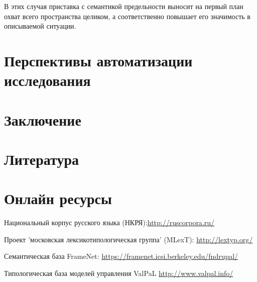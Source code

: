 В этих случая приставка с семантикой предельности выносит на первый план охват всего пространства целиком, а соответственно повышает его значимость в описываемой ситуации. 


\section{Перспективы автоматизации исследования}


\section{Заключение} \label{final}


\pagebreak
\section{Литература}
\renewcommand{\bibsection}{}
 

\section{Онлайн ресурсы}







\noindent \hypertarget{rusc}{Национальный корпус русского языка (НКРЯ)}:\;\url{http://ruscorpora.ru/} \medskip



\noindent \hypertarget{mlext}{Проект 'московская лексикотипологическая группа' (MLexT)}:\; \url{http://lextyp.org/} \medskip


\noindent \hypertarget{fn}{Семантическая база FrameNet:}\; \url{https://framenet.icsi.berkeley.edu/fndrupal/} \medskip

\noindent \hypertarget{valpal}{Типологическая база моделей управления ValPaL}\; \url{http://www.valpal.info/} \medskip

